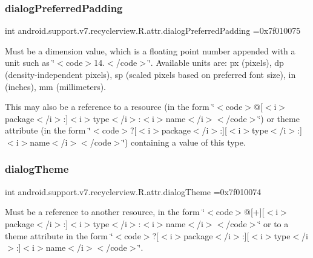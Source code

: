 \subsubsection{\texorpdfstring{dialog\+Preferred\+Padding}{dialogPreferredPadding}}
{\footnotesize\ttfamily int android.\+support.\+v7.\+recyclerview.\+R.\+attr.\+dialog\+Preferred\+Padding =0x7f010075\hspace{0.3cm}{\ttfamily [static]}}

Must be a dimension value, which is a floating point number appended with a unit such as \char`\"{}$<$code$>$14.\+5sp$<$/code$>$\char`\"{}. Available units are\+: px (pixels), dp (density-\/independent pixels), sp (scaled pixels based on preferred font size), in (inches), mm (millimeters). 

This may also be a reference to a resource (in the form \char`\"{}$<$code$>$@\mbox{[}$<$i$>$package$<$/i$>$\+:\mbox{]}$<$i$>$type$<$/i$>$\+:$<$i$>$name$<$/i$>$$<$/code$>$\char`\"{}) or theme attribute (in the form \char`\"{}$<$code$>$?\mbox{[}$<$i$>$package$<$/i$>$\+:\mbox{]}\mbox{[}$<$i$>$type$<$/i$>$\+:\mbox{]}$<$i$>$name$<$/i$>$$<$/code$>$\char`\"{}) containing a value of this type. \mbox{\label{classandroid_1_1support_1_1v7_1_1recyclerview_1_1R_1_1attr_a6c09654de59e1bea982ba5c09e3ed21f}} 
\subsubsection{\texorpdfstring{dialog\+Theme}{dialogTheme}}
{\footnotesize\ttfamily int android.\+support.\+v7.\+recyclerview.\+R.\+attr.\+dialog\+Theme =0x7f010074\hspace{0.3cm}{\ttfamily [static]}}

Must be a reference to another resource, in the form \char`\"{}$<$code$>$@\mbox{[}+\mbox{]}\mbox{[}$<$i$>$package$<$/i$>$\+:\mbox{]}$<$i$>$type$<$/i$>$\+:$<$i$>$name$<$/i$>$$<$/code$>$\char`\"{} or to a theme attribute in the form \char`\"{}$<$code$>$?\mbox{[}$<$i$>$package$<$/i$>$\+:\mbox{]}\mbox{[}$<$i$>$type$<$/i$>$\+:\mbox{]}$<$i$>$name$<$/i$>$$<$/code$>$\char`\"{}. \mbox{\label{classandroid_1_1support_1_1v7_1_1recyclerview_1_1R_1_1attr_ae4ed2e422c143cdd8e17b45f8894e0a6}} 
